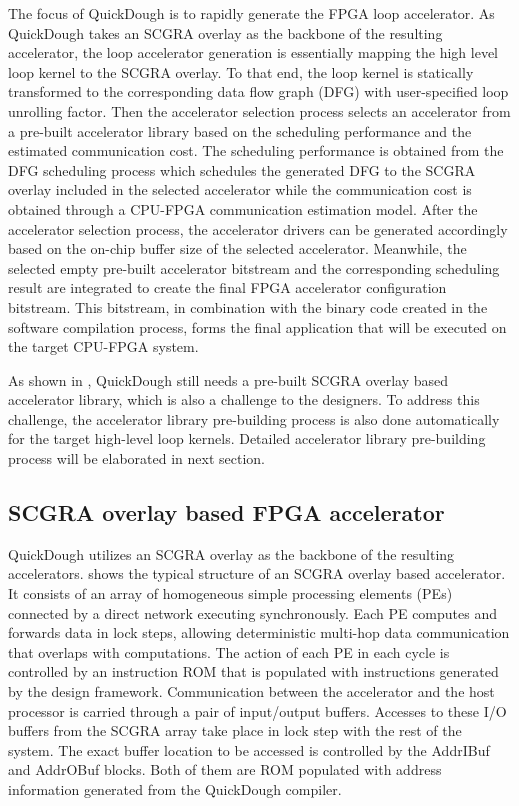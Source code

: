 The focus of QuickDough is to rapidly generate the FPGA loop accelerator. As QuickDough takes an SCGRA overlay as the backbone of the resulting accelerator, the loop accelerator generation is essentially mapping the high level loop kernel to the SCGRA overlay. To that end, the loop kernel is statically transformed to the corresponding data flow graph (DFG) with user-specified loop unrolling factor. Then the accelerator selection process selects an accelerator from a pre-built accelerator library based on the scheduling performance and the estimated communication cost. The scheduling performance is obtained from the DFG scheduling process which schedules the generated DFG to the SCGRA overlay included in the selected accelerator while the communication cost is obtained through a CPU-FPGA communication estimation model. After the accelerator selection process, the accelerator drivers can be generated accordingly based on the on-chip buffer size of the selected accelerator. Meanwhile, the selected empty pre-built accelerator bitstream and the corresponding scheduling result are integrated to create the final FPGA accelerator configuration bitstream. This bitstream, in combination with the binary code created in the software compilation process, forms the final application that will be executed on the target CPU-FPGA system.

As shown in , QuickDough still needs a pre-built SCGRA overlay based accelerator library, which is also a challenge to the designers. To address this challenge, the accelerator library pre-building process is also done automatically for the target high-level loop kernels. Detailed accelerator library pre-building process will be elaborated in next section.

\subsection{SCGRA overlay based FPGA accelerator}
QuickDough utilizes an SCGRA overlay as the backbone of the resulting accelerators.  shows the typical structure of an SCGRA overlay based accelerator. It consists of an array of homogeneous simple processing elements (PEs) connected by a direct network executing synchronously. Each PE computes and forwards data in lock steps, allowing deterministic multi-hop data communication that overlaps with computations. The action of each PE in each cycle is controlled by an instruction ROM that is populated with instructions generated by the design framework. Communication between the accelerator and the host processor is carried through a pair of input/output buffers. Accesses to these I/O buffers from the SCGRA array take place in lock step with the rest of the system. The exact buffer location to be accessed is controlled by the AddrIBuf and AddrOBuf blocks. Both of them are ROM populated with address information generated from the QuickDough compiler.

